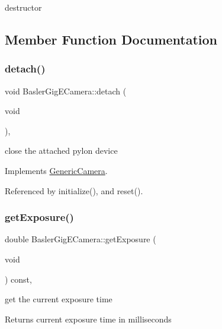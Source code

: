 destructor 

\subsection{Member Function Documentation}
\mbox{\label{classBaslerGigECamera_a13a51a76116cccbd537725457d83254f}} 
\subsubsection{\texorpdfstring{detach()}{detach()}}
{\footnotesize\ttfamily void Basler\+Gig\+E\+Camera\+::detach (\begin{DoxyParamCaption}\item[{void}]{ }\end{DoxyParamCaption})\hspace{0.3cm}{\ttfamily [override]}, {\ttfamily [virtual]}}

close the attached pylon device 

Implements \hyperlink{classGenericCamera_a86a91e987d6142e5417b2c07542e0aa4}{Generic\+Camera}.



Referenced by initialize(), and reset().

\mbox{\label{classBaslerGigECamera_a5f7897cae5155958ecaa8b2b9196e4e6}} 
\subsubsection{\texorpdfstring{get\+Exposure()}{getExposure()}}
{\footnotesize\ttfamily double Basler\+Gig\+E\+Camera\+::get\+Exposure (\begin{DoxyParamCaption}\item[{void}]{ }\end{DoxyParamCaption}) const\hspace{0.3cm}{\ttfamily [override]}, {\ttfamily [virtual]}}

get the current exposure time \begin{DoxyReturn}{Returns}
current exposure time in milliseconds 
\end{DoxyReturn}


